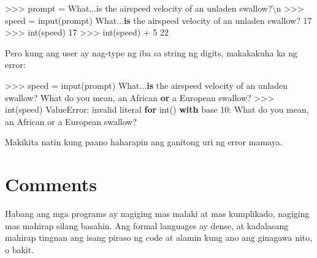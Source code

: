 \documentclass[10pt,]{book}
\newenvironment{Shaded}{}{}
\newcommand{\BuiltInTok}[1]{\textcolor[rgb]{0.00,0.50,0.00}{#1}}
\newcommand{\CharTok}[1]{\textcolor[rgb]{0.25,0.44,0.63}{#1}}
\newcommand{\ControlFlowTok}[1]{\textcolor[rgb]{0.00,0.44,0.13}{\textbf{#1}}}
\newcommand{\DecValTok}[1]{\textcolor[rgb]{0.25,0.63,0.44}{#1}}
\newcommand{\KeywordTok}[1]{\textcolor[rgb]{0.00,0.44,0.13}{\textbf{#1}}}
\newcommand{\NormalTok}[1]{#1}
\newcommand{\OperatorTok}[1]{\textcolor[rgb]{0.40,0.40,0.40}{#1}}
\newcommand{\PreprocessorTok}[1]{\textcolor[rgb]{0.74,0.48,0.00}{#1}}
\newcommand{\StringTok}[1]{\textcolor[rgb]{0.25,0.44,0.63}{#1}}
\begin{document}
\begin{Shaded}
\begin{Highlighting}[]
\OperatorTok{\textgreater{}\textgreater{}\textgreater{}}\NormalTok{ prompt }\OperatorTok{=} \StringTok{\textquotesingle{}What...is the airspeed velocity of an unladen swallow?}\CharTok{\textbackslash{}n}\StringTok{\textquotesingle{}}
\OperatorTok{\textgreater{}\textgreater{}\textgreater{}}\NormalTok{ speed }\OperatorTok{=} \BuiltInTok{input}\NormalTok{(prompt)}
\NormalTok{What...}\KeywordTok{is}\NormalTok{ the airspeed velocity of an unladen swallow?}
\DecValTok{17}
\OperatorTok{\textgreater{}\textgreater{}\textgreater{}} \BuiltInTok{int}\NormalTok{(speed)}
\DecValTok{17}
\OperatorTok{\textgreater{}\textgreater{}\textgreater{}} \BuiltInTok{int}\NormalTok{(speed) }\OperatorTok{+} \DecValTok{5}
\DecValTok{22}
\end{Highlighting}
\end{Shaded}

Pero kung ang user ay nag-type ng iba sa string ng digits, makakakuha ka
ng error:

\begin{Shaded}
\begin{Highlighting}[]
\OperatorTok{\textgreater{}\textgreater{}\textgreater{}}\NormalTok{ speed }\OperatorTok{=} \BuiltInTok{input}\NormalTok{(prompt)}
\NormalTok{What...}\KeywordTok{is}\NormalTok{ the airspeed velocity of an unladen swallow?}
\NormalTok{What do you mean, an African }\KeywordTok{or}\NormalTok{ a European swallow?}
\OperatorTok{\textgreater{}\textgreater{}\textgreater{}} \BuiltInTok{int}\NormalTok{(speed)}
\PreprocessorTok{ValueError}\NormalTok{: invalid literal }\ControlFlowTok{for} \BuiltInTok{int}\NormalTok{() }\ControlFlowTok{with}
\NormalTok{base }\DecValTok{10}\NormalTok{: }\StringTok{\textquotesingle{}What do you mean, an African or a European swallow?\textquotesingle{}}
\end{Highlighting}
\end{Shaded}

Makikita natin kung paano haharapin ang ganitong uri ng error mamaya.

 

\section{Comments}\label{comments}


Habang ang mga programs ay nagiging mas malaki at mas kumplikado,
nagiging mas mahirap silang basahin. Ang formal languages ay dense, at
kadalasang mahirap tingnan ang isang piraso ng code at alamin kung ano
ang ginagawa nito, o bakit.
\end{document}
